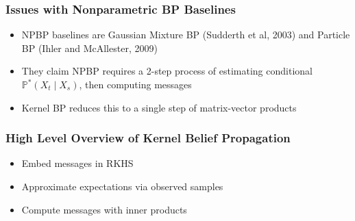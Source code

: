 \documentclass{beamer}
\begin{document}
\begin{frame}
\frametitle{Issues with Nonparametric BP Baselines}
\begin{itemize}
\item NPBP baselines are Gaussian Mixture BP (Sudderth et al, 2003) and 
Particle BP (Ihler and McAllester, 2009)
\vspace{2em}
\item They claim NPBP requires a 2-step process of estimating conditional $\mathbb{P}^*(X_t \mid X_s)$,
    then computing messages
\vspace{2em}
\item Kernel BP reduces this to a single step of matrix-vector products
\end{itemize}
\end{frame}

\begin{frame}
\frametitle{High Level Overview of Kernel Belief Propagation}
\begin{itemize}
\item Embed messages in RKHS
\vspace{2em}
\item Approximate expectations via observed samples 
\vspace{2em}
\item Compute messages with inner products
\end{itemize}
\end{frame}
\end{document}
